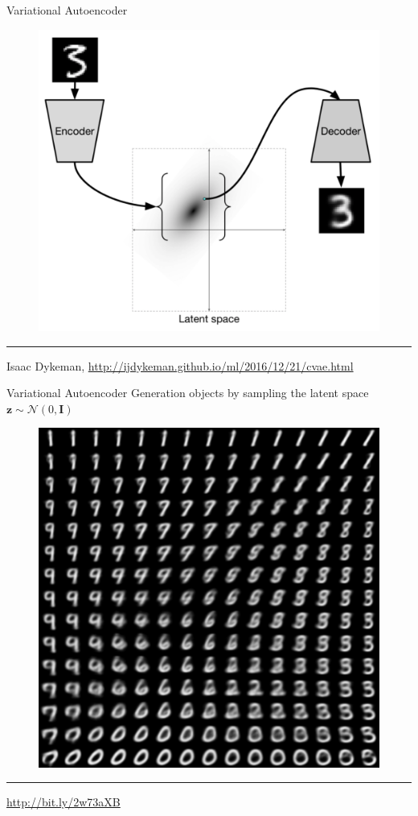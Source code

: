 \documentclass{beamer}
\newcommand{\bz}{\mathbf{z}}
\begin{document}
\begin{frame}{Variational Autoencoder}
\begin{figure}[h]
	\centering
	\includegraphics[width=.7\linewidth]{figs/VAE.png}
\end{figure}

\medskip\hrule\medskip
{\scriptsize Isaac Dykeman, \href{http://ijdykeman.github.io/ml/2016/12/21/cvae.html}{http://ijdykeman.github.io/ml/2016/12/21/cvae.html}}
\end{frame}
\begin{frame}{Variational Autoencoder}
Generation objects by sampling the latent space $\bz \sim \mathcal{N}(0, \mathbf{I})$
\begin{figure}[h]
	\centering
	\includegraphics[width=.5\linewidth]{figs/vae_0.png}
\end{figure}
\vfill
\hrule\medskip
{\scriptsize \href{http://bit.ly/2w73aXB}{http://bit.ly/2w73aXB}}
\end{frame}
\end{document}
